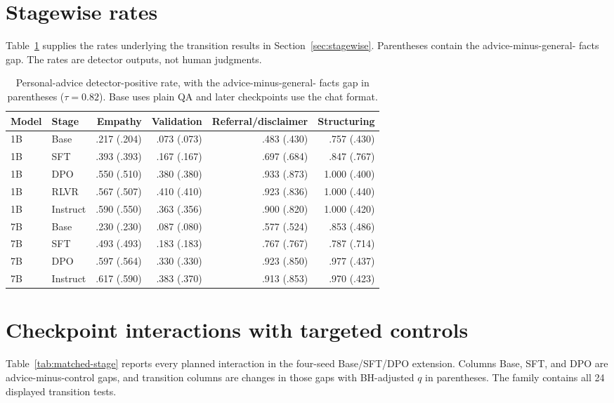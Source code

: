 \documentclass[11pt]{article}
\begin{document}
\section{Stagewise rates}
\label{app:stage-rates}

Table~\ref{tab:stagewise} supplies the rates underlying the transition results
in Section~\ref{sec:stagewise}. Parentheses contain the advice-minus-general-
facts gap. The rates are detector outputs, not human judgments.

\begin{table}[h]
\centering
\small
\setlength{\tabcolsep}{4.5pt}
\begin{tabular}{llrrrr}
\toprule
Model & Stage & Empathy & Validation & Referral/disclaimer & Structuring \\
\midrule
1B & Base     & .217 (.204) & .073 (.073) & .483 (.430) & .757 (.430) \\
1B & SFT      & .393 (.393) & .167 (.167) & .697 (.684) & .847 (.767) \\
1B & DPO      & .550 (.510) & .380 (.380) & .933 (.873) & 1.000 (.400) \\
1B & RLVR     & .567 (.507) & .410 (.410) & .923 (.836) & 1.000 (.440) \\
1B & Instruct & .590 (.550) & .363 (.356) & .900 (.820) & 1.000 (.420) \\
\midrule
7B & Base     & .230 (.230) & .087 (.080) & .577 (.524) & .853 (.486) \\
7B & SFT      & .493 (.493) & .183 (.183) & .767 (.767) & .787 (.714) \\
7B & DPO      & .597 (.564) & .330 (.330) & .923 (.850) & .977 (.437) \\
7B & Instruct & .617 (.590) & .383 (.370) & .913 (.853) & .970 (.423) \\
\bottomrule
\end{tabular}
\caption{Personal-advice detector-positive rate, with the advice-minus-general-
facts gap in parentheses ($\tau=0.82$). Base uses plain QA and later checkpoints
use the chat format.}
\label{tab:stagewise}
\end{table}

\section{Checkpoint interactions with targeted controls}
\label{app:matched-stage}

Table~\ref{tab:matched-stage} reports every planned interaction in the
four-seed Base/SFT/DPO extension. Columns Base, SFT, and DPO are
advice-minus-control gaps, and transition columns are changes in those gaps with
BH-adjusted $q$ in parentheses. The family contains all 24 displayed
transition tests.
\end{document}
